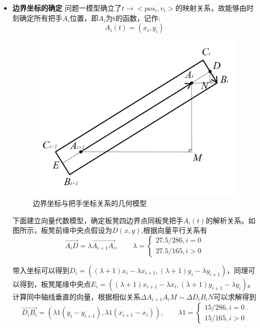\documentclass[a4paper]{article}
\begin{document}
    \begin{itemize}
        \item {\textbf{边界坐标的确定}}
        问题一模型确立了$t\to<pos_i,v_i>$的映射关系，故能够由时刻确定所有把手$A_{i}$位置，即$A_{i}$为t的函数，记作:$$A_{i}(t) = (x_i, y_i)$$
        \begin{figure}[H]
            \centering
            \includegraphics[width=0.5\linewidth]{image/Figure_5213.png}
            \caption{边界坐标与把手坐标关系的几何模型}
            \label{fig:enter-label1}
        \end{figure}

        下面建立向量代数模型，确定板凳四边界点同板凳把手$A_i(t)$的解析关系。如图所示，板凳前缘中央点假设为$D(x,y)$,根据向量平行关系有
        $$
                   \overrightarrow{A_iD} = \lambda\overrightarrow{A_{i+1}A_i}
        ,\quad\quad \lambda = \left\{ \begin{array}{c}
              27.5 / 286, i = 0 \\
              27.5 / 165, i > 0

        \end{array}\right.
        $$

        带入坐标可以得到$D_i = ((\lambda + 1) x_{i} - \lambda x_{i + 1}, (\lambda + 1) y_{i} - \lambda y_{i + 1})$，同理可以得到，板凳尾缘中央点$E_i = ((\lambda + 1) x_{i + 1} - \lambda x_{i}, (\lambda + 1) y_{i + 1} - \lambda y_{i})$。
        计算同中轴线垂直的向量，根据相似关系$\Delta A_{i+ 1}A_iM \sim \Delta D_iB_iN$可以求解得到
        $$\overrightarrow{D_i B_i} = (\lambda 1 (y_i - y_{i + 1}), \lambda 1 (x_{i + 1} - x_i)),
        \quad \quad \lambda 1 = \left\{ \begin{array}{c}
             15/286, i = 0  \\
             15/165, i > 0
        \end{array}
        \right.$$


\end{itemize}
\end{document}
